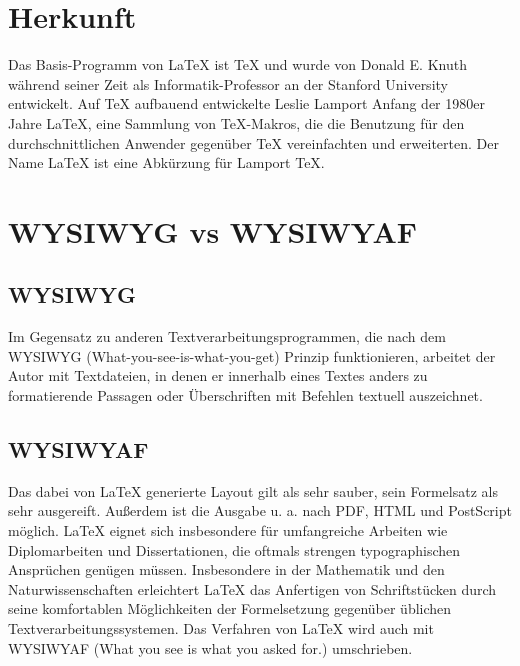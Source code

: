 \documentclass[ 12pt, a4paper, parskip=full]{scrartcl}
\begin{document}
\tableofcontents

\pagebreak 
\section{Herkunft}

Das Basis-Programm von LaTeX ist TeX und wurde von Donald E. Knuth während seiner Zeit als Informatik-Professor an der Stanford University entwickelt. Auf TeX aufbauend entwickelte Leslie Lamport Anfang der 1980er Jahre LaTeX, eine Sammlung von TeX-Makros, die die Benutzung für den durchschnittlichen Anwender gegenüber TeX vereinfachten und erweiterten. Der Name LaTeX ist eine Abkürzung für Lamport TeX. 

\pagebreak
\section{WYSIWYG vs WYSIWYAF}

\subsection{WYSIWYG}
Im Gegensatz zu anderen Textverarbeitungsprogrammen, die nach dem WYSIWYG (What-you-see-is-what-you-get) Prinzip funktionieren, arbeitet der Autor mit Textdateien, in denen er innerhalb eines Textes anders zu formatierende Passagen oder Überschriften mit Befehlen textuell auszeichnet.

\subsection{WYSIWYAF}
Das dabei von LaTeX generierte Layout gilt als sehr sauber, sein Formelsatz als sehr ausgereift. Außerdem ist die Ausgabe u. a. nach PDF, HTML und PostScript möglich. LaTeX eignet sich insbesondere für umfangreiche Arbeiten wie Diplomarbeiten und Dissertationen, die oftmals strengen typographischen Ansprüchen genügen müssen. Insbesondere in der Mathematik und den Naturwissenschaften erleichtert LaTeX das Anfertigen von Schriftstücken durch seine komfortablen Möglichkeiten der Formelsetzung gegenüber üblichen Textverarbeitungssystemen. Das Verfahren von LaTeX wird auch mit WYSIWYAF (What you see is what you asked for.) umschrieben. 
\end{document}
